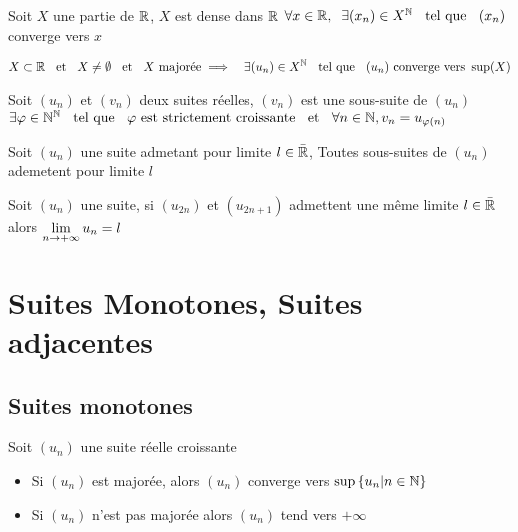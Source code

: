 \begin{prp}
Soit $X$ une partie de $\mathbb{R}$, $X$ est dense dans $\mathbb{R}$ \ssi
$\forall x \in \mathbb{R}, \;\; \exists (x_n) \in X^{\mathbb{N}} \;\;\text{ tel que }\;\; (x_n)$ converge vers
$x$
\end{prp}

\begin{prp}
\begin{align*}
            &X \subset \mathbb{R} \;\;\text{ et }\;\; X \neq \emptyset \;\;\text{ et }\;\; X \text{ majorée}
\implies    &\exists (u_n) \in X^{\mathbb{N}} \;\;\text{ tel que }\;\; (u_n) \text{ converge vers } \sup(X)
\end{align*}
\end{prp}



\begin{dfn}
Soit $(u_n)$ et $(v_n)$ deux suites réelles,
$(v_n)$ est une sous-suite de $(u_n)$ \ssi
$\exists \varphi \in \mathbb{N}^{\mathbb{N}} \;\;\text{ tel que }\;\; \varphi \text{ est strictement croissante}
\;\;\text{ et }\;\; \forall n \in \mathbb{N} , v_n = u_{\varphi(n)}$
\end{dfn}

\begin{prp}
Soit $(u_n)$ une suite admetant pour limite $l \in \bar{\mathbb{R}}$,
Toutes sous-suites de $(u_n)$ ademetent pour limite $l$
\end{prp}

\begin{prp}
Soit $(u_n)$ une suite, si $(u_{2n})$ et $(u_{2n + 1})$ admettent une même
limite $l \in \bar{\mathbb{R}}$ alors $\lim\limits_{n \to +\infty} u_n = l$
\end{prp}

\section{Suites Monotones, Suites adjacentes}

\subsection{Suites monotones}

\begin{thm}
Soit $(u_n)$ une suite réelle croissante
\begin{itemize}
    \item Si $(u_n)$ est majorée, alors $(u_n)$ converge vers 
    $\sup\left\{ u_n \middle| n \in \mathbb{N} \right\}$
    \item Si $(u_n)$ n'est pas majorée alors $(u_n)$ tend vers $+\infty$
\end{itemize}
\end{thm}

